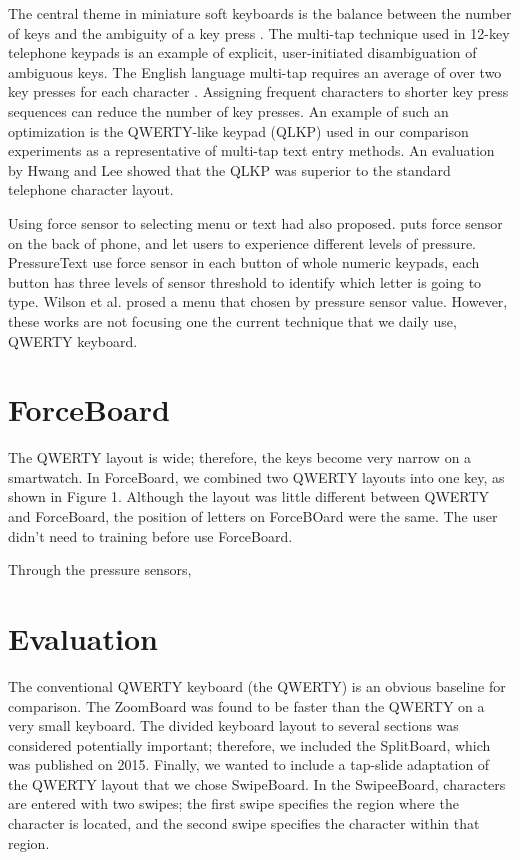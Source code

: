 \documentclass{sigchi}
\begin{document}
The central theme in miniature soft keyboards is the balance between the number of keys and the ambiguity of a key press \cite{MacKenzie:2002:KCT:645739.666587}. The multi-tap technique used in 12-key telephone keypads is an example of explicit, user-initiated disambiguation of ambiguous keys. The English language multi-tap requires an average of over two key presses for each character \cite{MacKenzie:2002:KCT:645739.666587}. Assigning frequent characters to shorter key press sequences can reduce the number of key presses. An example of such an optimization is the QWERTY-like keypad (QLKP) used in our comparison experiments as a representative of multi-tap text entry methods. An evaluation by Hwang and Lee \cite{Hwang:2005:QKL:1056808.1056946} showed that the QLKP was superior to the standard telephone character layout.

Using force sensor to selecting menu or text had also proposed. \cite{Stewart:2010:CPI:1753326.1753444,Stewart:2012:EIV:2371574.2371581} puts force sensor on the back of phone, and let users to experience different levels of pressure. PressureText \cite{McCallum:2009:PPI:1520340.1520693} use force sensor in each button of whole numeric keypads, each button has three levels of sensor threshold to identify which letter is going to type. Wilson et al. \cite{Wilson:2010:PMS:1851600.1851631} prosed a menu that chosen by pressure sensor value. However, these works are not focusing one the current technique that we daily use, QWERTY keyboard.
\section{ForceBoard}
The QWERTY layout is wide; therefore, the keys become very narrow on a smartwatch. In ForceBoard, we combined two QWERTY layouts into one key, as shown in Figure 1. Although the layout was little different between QWERTY and ForceBoard, the position of letters on ForceBOard were the same. The user didn't need to training before use ForceBoard. 

Through the pressure sensors,

\section{Evaluation}
The conventional QWERTY keyboard (the QWERTY) is an obvious baseline for comparison. The ZoomBoard was
found to be faster than the QWERTY on a very small keyboard. The divided keyboard layout to several sections was considered potentially important; therefore, we included the SplitBoard, which was published on 2015. Finally,
we wanted to include a tap-slide adaptation of the QWERTY layout that we chose SwipeBoard. In the SwipeeBoard, characters are entered with two swipes; the first swipe specifies the region where the character is located, and the second swipe specifies the character within that region. 
\end{document}
